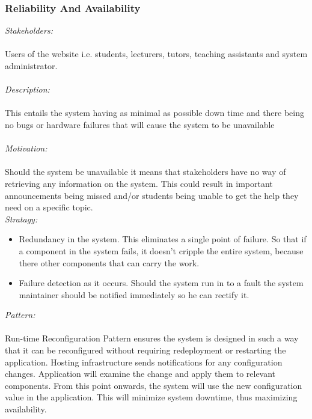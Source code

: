 \documentclass[a4paper,12pt]{report}
\begin{document}
		\subsubsection{Reliability And Availability}
		\emph{Stakeholders: }\\\\ Users of the website i.e. students, lecturers, tutors, teaching assistants and system administrator. \\
		\\\emph{Description: }\\\\This entails the system having as minimal as possible down time and there being no bugs or hardware failures that will cause the system to be unavailable \\
		\\\emph{Motivation: }\\\\ Should the system be unavailable it means that stakeholders have no way of retrieving any information on the system. This could result in important announcements being missed and/or students being unable to get the help they need on a specific topic. \\
		
		\emph{Stratagy: }\\
		\begin{itemize}
		\item Redundancy in the system. This eliminates a single point of failure. So that if a component in the system fails, it doesn’t cripple the entire system, because there other components that can carry the work.
		
		\item Failure detection as it occurs. Should the system run in to a fault the system maintainer should be notified immediately so he can rectify it. 
		\end{itemize}
		
		\emph{Pattern: }\\\\ Run-time Reconfiguration Pattern ensures the system is designed in such a way that it can be reconfigured without requiring redeployment or restarting the application. Hosting infrastructure sends notifications for any configuration changes. Application will examine the change and apply them to relevant components. From this point onwards, the system will use the new configuration value in the application. This will minimize system downtime, thus maximizing availability.
		
\end{document}

